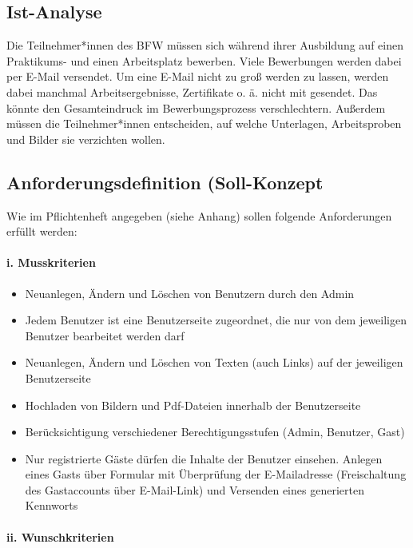 \documentclass[10pt]{scrarticle}
\begin{document}
\subsection{Ist-Analyse}

Die Teilnehmer*innen des BFW müssen sich während ihrer Ausbildung auf einen Praktikums- und einen Arbeitsplatz bewerben. Viele Bewerbungen werden dabei per E-Mail versendet. Um eine E-Mail nicht zu groß werden zu lassen, werden dabei manchmal Arbeitsergebnisse, Zertifikate o. ä. nicht mit gesendet. Das könnte den Gesamteindruck im Bewerbungsprozess verschlechtern.  
 Außerdem müssen die Teilnehmer*innen entscheiden, auf welche Unterlagen, Arbeitsproben und Bilder sie verzichten wollen.
 
\subsection{Anforderungsdefinition (Soll-Konzept}

Wie im Pflichtenheft angegeben (siehe Anhang) sollen folgende Anforderungen erfüllt werden:

\paragraph{i. Musskriterien}

\begin{itemize}
\item Neuanlegen, Ändern und Löschen von Benutzern durch den Admin
\item Jedem Benutzer ist eine Benutzerseite zugeordnet, die nur von dem jeweiligen Benutzer bearbeitet werden darf
\item Neuanlegen, Ändern und Löschen von Texten (auch Links) auf der jeweiligen Benutzerseite
\item Hochladen von Bildern und Pdf-Dateien innerhalb der Benutzerseite
\item Berücksichtigung verschiedener Berechtigungsstufen (Admin, Benutzer, Gast)
\item  Nur registrierte Gäste dürfen die Inhalte der Benutzer einsehen. Anlegen eines Gasts über Formular mit Überprüfung der E-Mailadresse (Freischaltung des Gastaccounts über E-Mail-Link) und Versenden eines generierten Kennworts 
\end{itemize}

\paragraph{ii. Wunschkriterien}
\end{document}
